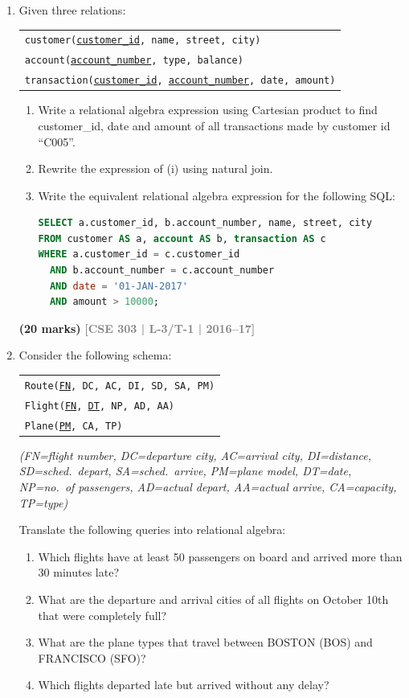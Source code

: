 \documentclass[12pt]{article}
\newcommand{\yr}[1]{\hfill\textcolor{gray}{\small\textbf{[#1]}}}
\newcommand{\mk}[1]{\textcolor{orange!70!black}{\small\textbf{(#1 marks)}}}
\begin{document}
\begin{enumerate}
\item Given three relations:
\begin{center}
\begin{tabular}{l}
\texttt{customer(\underline{customer\_id}, name, street, city)}\\
\texttt{account(\underline{account\_number}, type, balance)}\\
\texttt{transaction(\underline{customer\_id}, \underline{account\_number}, date, amount)}
\end{tabular}
\end{center}
\begin{enumerate}
  \item Write a relational algebra expression using Cartesian product to find customer\_id, date and amount of all transactions made by customer id ``C005''.
  \item Rewrite the expression of (i) using natural join.
  \item Write the equivalent relational algebra expression for the following SQL:
\begin{lstlisting}[language=SQL]
SELECT a.customer_id, b.account_number, name, street, city
FROM customer AS a, account AS b, transaction AS c
WHERE a.customer_id = c.customer_id
  AND b.account_number = c.account_number
  AND date = '01-JAN-2017'
  AND amount > 10000;
\end{lstlisting}
\end{enumerate}
\mk{20} \yr{CSE 303 | L-3/T-1 | 2016--17}


\item Consider the following schema:
\begin{center}
\begin{tabular}{l}
\texttt{Route(\underline{FN}, DC, AC, DI, SD, SA, PM)}\\
\texttt{Flight(\underline{FN}, \underline{DT}, NP, AD, AA)}\\
\texttt{Plane(\underline{PM}, CA, TP)}
\end{tabular}
\end{center}
\textit{(FN=flight number, DC=departure city, AC=arrival city, DI=distance, SD=sched.\ depart, SA=sched.\ arrive, PM=plane model, DT=date, NP=no.\ of passengers, AD=actual depart, AA=actual arrive, CA=capacity, TP=type)}

Translate the following queries into relational algebra:
\begin{enumerate}
  \item Which flights have at least 50 passengers on board and arrived more than 30 minutes late?
  \item What are the departure and arrival cities of all flights on October 10th that were completely full?
  \item What are the plane types that travel between BOSTON (BOS) and FRANCISCO (SFO)?
  \item Which flights departed late but arrived without any delay?
\end{enumerate}
\begin{center}
\renewcommand{\arraystretch}{1.1} %
\begin{tabular}{cl}


\end{tabular}
\end{center}
\end{enumerate}
\end{document}
